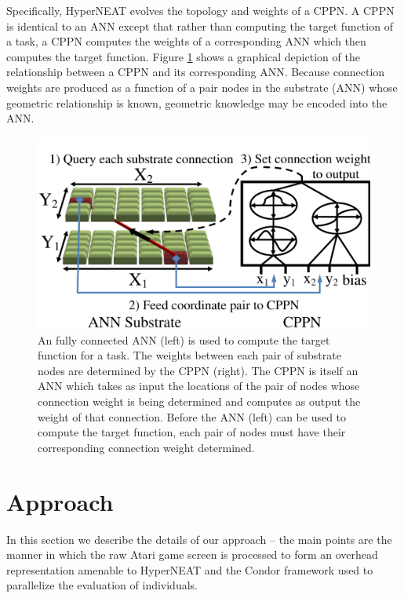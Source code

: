 \documentclass{acm_proc_article-sp}
\begin{document}
Specifically, HyperNEAT evolves the topology and weights of a CPPN. A CPPN is identical to an ANN except that rather than computing the target function of a task, a CPPN computes the weights of a corresponding ANN which then computes the target function. Figure \ref{fig:cppn} shows a graphical depiction of the relationship between a CPPN and its corresponding ANN. Because connection weights are produced as a function of a pair nodes in the substrate (ANN) whose geometric relationship is known, geometric knowledge may be encoded into the ANN. 

\begin{figure}[htp]
\begin{center}
\includegraphics[width=\columnwidth]{figures/cppn}
\end{center}
\caption{An fully connected ANN (left) is used to compute the target function for a task. The weights between each pair of substrate nodes are determined by the CPPN (right). The CPPN is itself an ANN which takes as input the locations of the pair of nodes whose connection weight is being determined and computes as output the weight of that connection. Before the ANN (left) can be used to compute the target function, each pair of nodes must have their corresponding connection weight determined.}
\label{fig:cppn}
\end{figure}

\section{Approach}
\label{sec:approach}
In this section we describe the details of our approach -- the main points are the manner in which the raw Atari game screen is processed to form an overhead representation amenable to HyperNEAT and the Condor framework used to parallelize the evaluation of individuals.
\end{document}
